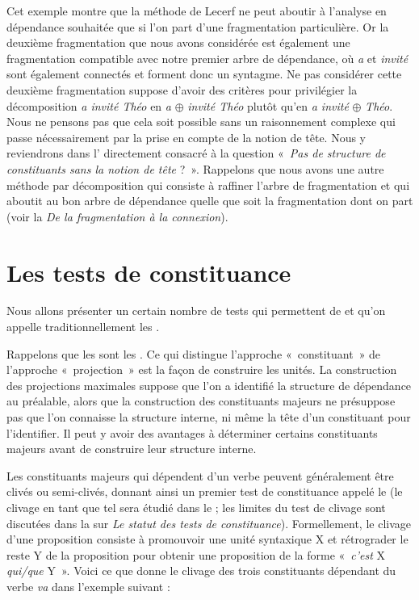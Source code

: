 {    Cet exemple montre que la méthode de Lecerf ne peut aboutir à l’analyse en dépendance souhaitée que si l’on part d’une fragmentation particulière. Or la deuxième fragmentation que nous avons considérée est également une fragmentation compatible avec notre premier arbre de dépendance, où \textit{a} et \textit{invité} sont également connectés et forment donc un syntagme. Ne pas considérer cette deuxième fragmentation suppose d’avoir des critères pour privilégier la décomposition \textit{a invité Théo} en \textit{a} \textrm{${\oplus}$} \textit{invité Théo} plutôt qu’en \textit{a invité} \textrm{${\oplus}$} \textit{Théo}. Nous ne pensons pas que cela soit possible sans un raisonnement complexe qui passe nécessairement par la prise en compte de la notion de tête. Nous y reviendrons dans l’ directement consacré à la question «~\textit{Pas de structure de constituants sans la notion de tête} ?~». Rappelons que nous avons une autre méthode par décomposition qui consiste à raffiner l’arbre de fragmentation et qui aboutit au bon arbre de dépendance quelle que soit la fragmentation dont on part (voir la  \textit{De la fragmentation à la connexion}).
}
\section{Les tests de constituance}\label{sec:3.4.10}

Nous allons présenter un certain nombre de tests qui permettent de  et qu’on appelle traditionnellement les .

Rappelons que les  sont les . Ce qui distingue l’approche «~constituant~» de l’approche «~projection~» est la façon de construire les unités. La construction des projections maximales suppose que l’on a identifié la structure de dépendance au préalable, alors que la construction des constituants majeurs ne présuppose pas que l’on connaisse la structure interne, ni même la tête d’un constituant pour l’identifier. Il peut y avoir des avantages à déterminer certains constituants majeurs avant de construire leur structure interne.

Les constituants majeurs qui dépendent d’un verbe peuvent généralement être clivés ou semi-clivés, donnant ainsi un premier test de constituance appelé le  (le clivage en tant que tel sera étudié dans le  ; les limites du test de clivage sont discutées dans la  sur \textit{Le statut des tests de constituance}). Formellement, le clivage d'une proposition consiste à promouvoir une unité syntaxique X et rétrograder le reste Y de la proposition pour obtenir une proposition de la forme «~\textit{c'est} X \textit{qui/que}
Y~».
Voici ce que donne le clivage des trois constituants dépendant du verbe \textit{va} dans l’exemple suivant :

